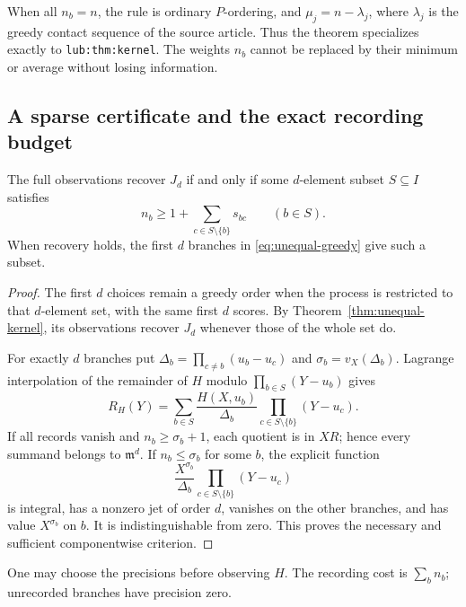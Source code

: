 When all $n_b=n$, the rule is ordinary $P$-ordering, and
$\mu_j=n-\lambda_j$, where $\lambda_j$ is the greedy contact sequence of the
source article.  Thus the theorem specializes exactly to
\texttt{lub:thm:kernel}.  The weights $n_b$ cannot be replaced by their
minimum or average without losing information.

\subsection{A sparse certificate and the exact recording budget}

\begin{corollary}
\label{cor:unequal-certificate}
The full observations recover $J_d$ if and only if some $d$-element subset
$S\subseteq I$ satisfies
\begin{equation}
 n_b\ge1+\sum_{c\in S\setminus\{b\}}s_{bc}\qquad(b\in S).
 \label{eq:unequal-certificate}
\end{equation}
When recovery holds, the first $d$ branches in
\eqref{eq:unequal-greedy} give such a subset.
\end{corollary}

\begin{proof}
The first $d$ choices remain a greedy order when the process is restricted
to that $d$-element set, with the same first $d$ scores.  By
Theorem~\ref{thm:unequal-kernel}, its observations recover $J_d$ whenever
those of the whole set do.

For exactly $d$ branches put
$\Delta_b=\prod_{c\ne b}(u_b-u_c)$ and $\sigma_b=v_X(\Delta_b)$.
Lagrange interpolation of the remainder of $H$ modulo
$\prod_{b\in S}(Y-u_b)$ gives
\[
 R_H(Y)=\sum_{b\in S}\frac{H(X,u_b)}{\Delta_b}
                  \prod_{c\in S\setminus\{b\}}(Y-u_c).
\]
If all records vanish and $n_b\ge\sigma_b+1$, each quotient is in $XR$;
hence every summand belongs to $\mathfrak m^d$.  If $n_b\le\sigma_b$ for
some $b$, the explicit function
\[
 \frac{X^{\sigma_b}}{\Delta_b}
       \prod_{c\in S\setminus\{b\}}(Y-u_c)
\]
is integral, has a nonzero jet of order $d$, vanishes on the other branches,
and has value $X^{\sigma_b}$ on $b$.  It is indistinguishable from zero.
This proves the necessary and sufficient componentwise criterion.
\end{proof}

One may choose the precisions before observing $H$.  The recording cost is
$\sum_b n_b$; unrecorded branches have precision zero.

